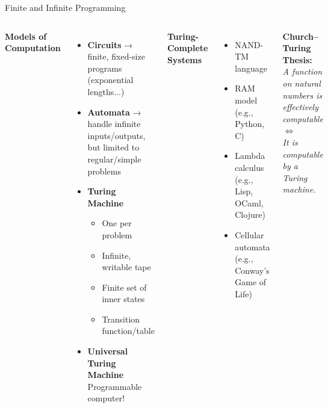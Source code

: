 \documentclass{beamer}
\begin{document}
\begin{frame}{Finite and Infinite Programming}

\begin{columns}[onlytextwidth]
\textbf{Models of Computation}
\begin{itemize}
    \item \textbf{Circuits} → finite, fixed-size programs (exponential lengths...)
    \item \textbf{Automata} → handle infinite inputs/outputs, but limited to regular/simple problems
    \item \textbf{Turing Machine}\\
    \begin{itemize}
    \item One per problem
        \item Infinite, writable tape
        \item Finite set of inner states
        \item Transition function/table 
    \end{itemize}

    \item \textbf{Universal Turing Machine}\\
    Programmable computer!
\end{itemize}



\small
\textbf{Turing-Complete Systems}

\begin{itemize}
    \item NAND-TM language
    \item RAM model (e.g., Python, C)
    \item Lambda calculus (e.g., Lisp, OCaml, Clojure)
    \item Cellular automata (e.g., Conway’s Game of Life)
\end{itemize}

\vfill
\begin{center}
\textcolor{new_turquoise}{\bf Church–Turing Thesis:} \\ 
\textit{A function on natural numbers is effectively computable} \\
$\Leftrightarrow$ \\
\textit{It is computable by a Turing machine.}
\end{center}
\end{columns}

\end{frame}
\end{document}
